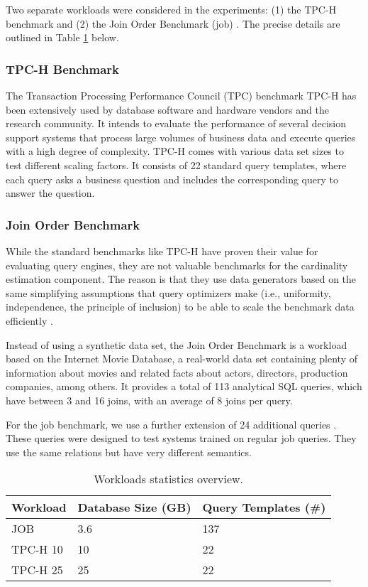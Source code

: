 Two separate workloads were considered in the experiments: (1) the TPC-H benchmark \citep{tpch} and (2) the Join Order Benchmark (\gls{job}) \citep{JOB}. The precise details are outlined in Table \ref{tab:workloads} below.

\subsubsection{TPC-H Benchmark}

The Transaction Processing Performance Council (TPC) benchmark TPC-H has been extensively used by database software and hardware vendors and the research community. It intends to evaluate the performance of several decision support systems that process large volumes of business data and execute queries with a high degree of complexity. TPC-H comes with various data set sizes to test different scaling factors. It consists of 22 standard query templates, where each query asks a business question and includes the corresponding query to answer the question.

\subsubsection{Join Order Benchmark}

While the standard benchmarks like TPC-H have proven their value for evaluating query engines, they are not valuable benchmarks for the cardinality estimation component. The reason is that they use data generators based on the same simplifying assumptions that query optimizers make (i.e., uniformity, independence, the principle of inclusion) to be able to scale the benchmark data efficiently \citep{Leis2015}.

Instead of using a synthetic data set, the Join Order Benchmark is a workload based on the Internet Movie Database, a real-world data set containing plenty of information about movies and related facts about actors, directors, production companies, among others. It provides a total of 113 analytical SQL queries, which have between 3 and 16 joins, with an average of 8 joins per query.

For the \gls{job} benchmark, we use a further extension of 24 additional queries \citep{Marcus2018a}. These queries were designed to test systems trained on regular \gls{job} queries. They use the same relations but have very different semantics.

\begin{table}[H]
\centering
\begin{tabular*}{0.9\textwidth}{p{} p{} p{}}
\hline
\textbf{Workload} & \multicolumn{1}{l}{\textbf{Database Size (GB})} & \multicolumn{1}{l}{\textbf{Query Templates (\#)}}   \\ \hline
JOB       & 3.6       & 137                       \\
TPC-H 10    & 10        & 22                        \\
TPC-H 25    & 25        & 22                        \\ \hline
\end{tabular*}
\caption{Workloads statistics overview.}
\label{tab:workloads}
\end{table}


